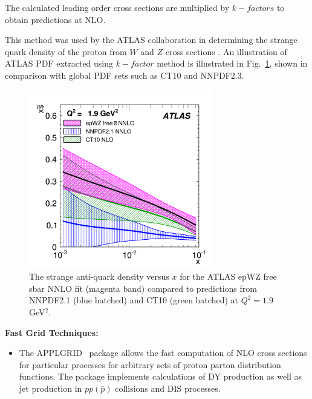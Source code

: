 \begin{description}
\begin{itemize}
The calculated leading order cross sections are multiplied by
$k-factors$ to obtain predictions at NLO.

This method was used by the ATLAS collaboration in determining the strange quark density of the proton from  $W$ and $Z$ cross sections \cite{atlas:prl109-012001}. An illustration of ATLAS PDF extracted using $k-factor$ method is illustrated in Fig.~\ref{fig:atlas}, shown in comparison with global PDF sets such as CT10\cite{ct10} and NNPDF2.3\cite{cite:nnpdf}.

\begin{figure}[!ht]
   \centering
   \includegraphics[width=8cm]{atlas.pdf}
   \caption{The strange anti-quark density versus $x$ for the ATLAS epWZ free sbar NNLO fit (magenta band) compared to predictions from NNPDF2.1 (blue hatched) and CT10 (green hatched) at $Q^2= 1.9$ GeV$^2$.}
 \label{fig:atlas}
\end{figure}

\end{itemize}



\item \bf {Fast Grid Techniques:} \rm


\begin{itemize}
\item The APPLGRID~\cite{Carli:2010rw} package allows the fast computation 
of NLO cross sections for particular processes for arbitrary sets of 
proton parton distribution functions. The package implements
calculations of DY production as well as jet production in $pp(\bar p)$
collisions and DIS processes. 


\end{itemize}
\end{description}

